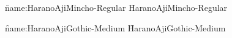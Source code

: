 

\nopagenumbers

\font\f{name:HaranoAjiMincho-Regular} \f
HaranoAjiMincho-Regular

\font\f{name:HaranoAjiGothic-Medium} \f
HaranoAjiGothic-Medium

\bye
